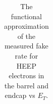 \begin{table}
\begin{center}
{\begin{tabular}{|c|c|c|c|}
\end{tabular}}
\caption{The functional approximation of the measured fake rate for HEEP electrons in the barrel and endcap vs $E_T$.}
\label{fr:tab:heepFRV70}

\end{center}
\end{table}

%
%
